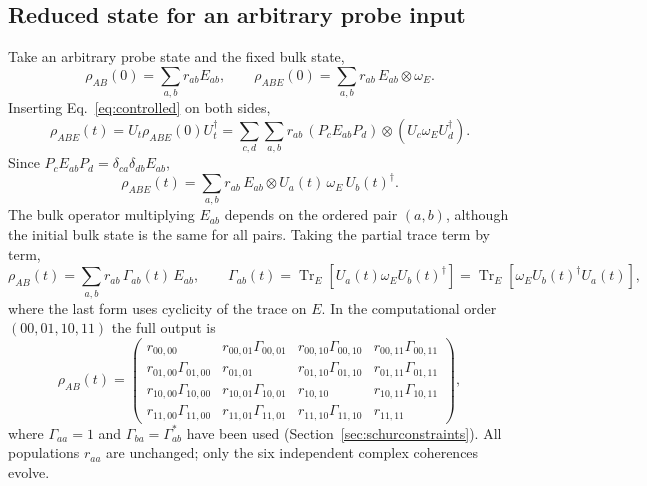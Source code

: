 \documentclass[11pt,a4paper]{article}
\newcommand{\Tr}{\operatorname{Tr}}
\begin{document}
\subsection{Reduced state for an arbitrary probe input}
\label{sec:reducedstate}

Take an arbitrary probe state and the fixed bulk state,
\begin{equation}
 \rho_{AB}(0)=\sum_{a,b}r_{ab}E_{ab},\qquad
 \rho_{ABE}(0)=\sum_{a,b}r_{ab}\,E_{ab}\otimes\omega_E .
\end{equation}
Inserting Eq.~\eqref{eq:controlled} on both sides,
\begin{equation}
 \rho_{ABE}(t)=U_t\rho_{ABE}(0)U_t^\dagger
 =\sum_{c,d}\sum_{a,b}r_{ab}\,(P_cE_{ab}P_d)\otimes(U_c\omega_EU_d^\dagger).
\end{equation}
Since $P_cE_{ab}P_d=\delta_{ca}\delta_{db}E_{ab}$,
\begin{equation}
 \rho_{ABE}(t)=\sum_{a,b}r_{ab}\,E_{ab}\otimes U_a(t)\,\omega_E\,U_b(t)^\dagger .
 \label{eq:jointstate}
\end{equation}
The bulk operator multiplying $E_{ab}$ depends on the ordered pair
$(a,b)$, although the initial bulk state is the same for all pairs.
Taking the partial trace term by term,
\begin{equation}
 \rho_{AB}(t)=\sum_{a,b}r_{ab}\,\Gamma_{ab}(t)\,E_{ab},\qquad
 \Gamma_{ab}(t)=\Tr_E[U_a(t)\omega_EU_b(t)^\dagger]
 =\Tr_E[\omega_EU_b(t)^\dagger U_a(t)],
 \label{eq:gamma}
\end{equation}
where the last form uses cyclicity of the trace on $E$. In the
computational order $(00,01,10,11)$ the full output is
\begin{equation}
\rho_{AB}(t)=
\begin{pmatrix}
 r_{00,00}&r_{00,01}\Gamma_{00,01}&r_{00,10}\Gamma_{00,10}&r_{00,11}\Gamma_{00,11}\\
 r_{01,00}\Gamma_{01,00}&r_{01,01}&r_{01,10}\Gamma_{01,10}&r_{01,11}\Gamma_{01,11}\\
 r_{10,00}\Gamma_{10,00}&r_{10,01}\Gamma_{10,01}&r_{10,10}&r_{10,11}\Gamma_{10,11}\\
 r_{11,00}\Gamma_{11,00}&r_{11,01}\Gamma_{11,01}&r_{11,10}\Gamma_{11,10}&r_{11,11}
\end{pmatrix},
\label{eq:sixteen}
\end{equation}
where $\Gamma_{aa}=1$ and $\Gamma_{ba}=\Gamma_{ab}^*$ have been used
(Section~\ref{sec:schurconstraints}). All populations $r_{aa}$ are
unchanged; only the six independent complex coherences evolve.
\end{document}
